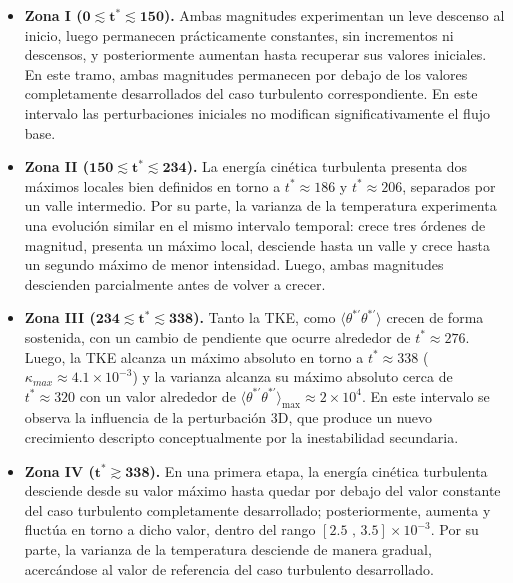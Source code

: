 \begin{itemize}
\item \textbf{Zona I ($\mathbf{0 \lesssim t^* \lesssim 150}$).} Ambas magnitudes experimentan un leve descenso al inicio, luego permanecen prácticamente constantes, sin incrementos ni descensos, y posteriormente aumentan hasta recuperar sus valores iniciales. En este tramo, ambas magnitudes permanecen por debajo de los valores completamente desarrollados del caso turbulento correspondiente. En este intervalo las perturbaciones iniciales no modifican significativamente el flujo base.

\item \textbf{Zona II ($\mathbf{150 \lesssim t^* \lesssim 234}$).} La energía cinética turbulenta presenta dos máximos locales bien definidos en torno a $t^*\approx186$ y $t^*\approx206$, separados por un valle intermedio. Por su parte, la varianza de la temperatura experimenta una evolución similar en el mismo intervalo temporal: crece tres órdenes de magnitud, presenta un máximo local, desciende hasta un valle y crece hasta un segundo máximo de menor intensidad. Luego, ambas magnitudes descienden parcialmente antes de volver a crecer.

\item \textbf{Zona III ($\mathbf{234 \lesssim t^* \lesssim 338}$).} Tanto la TKE, como $\langle \theta^{* \prime} \theta^{* \prime} \rangle$ crecen de forma sostenida, con un cambio de pendiente que ocurre alrededor de $t^*\approx276$. Luego, la TKE alcanza un máximo absoluto en torno a $t^*\approx338$ ($\kappa_{max} \approx 4\text{.}1 \times 10^{-3}$) y la varianza alcanza su máximo absoluto cerca de $t^*\approx320$ con un valor alrededor de $\langle \theta^{* \prime} \theta^{* \prime} \rangle_{\text{max}} \approx 2 \times 10^{4}$. En este intervalo se observa la influencia de la perturbación 3D, que produce un nuevo crecimiento descripto conceptualmente por la inestabilidad secundaria.

\item \textbf{Zona IV ($\mathbf{t^* \gtrsim 338}$).} En una primera etapa, la energía cinética turbulenta desciende desde su valor máximo hasta quedar por debajo del valor constante del caso turbulento completamente desarrollado; posteriormente, aumenta y fluctúa en torno a dicho valor, dentro del rango $\left[ 2\text{.}5 \text{ , } 3\text{.}5 \right] \times 10^{-3}$. Por su parte, la varianza de la temperatura desciende de manera gradual, acercándose al valor de referencia del caso turbulento desarrollado.
\end{itemize}

